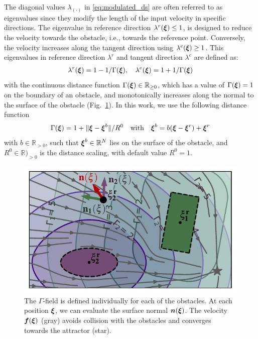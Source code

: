 The  diagonal values $\lambda_{(\cdot)}$  in \eqref{eq:modulated_ds} are often referred to as eigenvalues since they modify the length of the input velocity in specific directions. 
The eigenvalue in reference direction $\lambda^r(\boldsymbol{\xi}) \leq 1$, is designed to reduce the velocity towards the obstacle, i.e., towards the reference point.  
Conversely, the velocity increases along the tangent direction using $\lambda^e(\boldsymbol{\xi}) \geq 1$. This eigenvalues in reference direction $\lambda^r$ and tangent direction $\lambda^e$ are defined as:
\begin{equation}
\begin{split}
    \lambda^r(\vecs \xi) = 1 - 1 /\Gamma(\vecs \xi) , \quad \lambda^e(\vecs \xi) = 1 + 1 / \Gamma(\vecs \xi)
    \label{eq:eigenvalues}
    \end{split}
\end{equation}
with the continuous distance function $\Gamma(\boldsymbol{\xi}) \in \mathbb{R}_{\geq 0}$, which has a value of $\Gamma(\boldsymbol{\xi}) = 1$ on the boundary of an obstacle, and monotonically increases along the normal to the surface of the obstacle (Fig.~\ref{fig:resultant_normal}). In this work, we use the following distance function
\begin{equation}
  \Gamma(\vecs \xi) = 1 + \| \vecs \xi - \vecs \xi^b \|  / R^0
  \quad \text{with} \quad
  \vecs \xi^b = b (\vecs \xi - \vecs \xi^r) + \vecs \xi^r
  \label{eq:distance_function}
\end{equation}
with $b \in \mathbb{R}_{>0}$, such that $\boldsymbol{\xi}^b \in \mathbb{R}^N$ lies on the surface of the obstacle, and $R^0 \in \mathbb{R})_{>0}$ is the distance scaling, with default value $R^0 = 1$.

\begin{figure}
\centerline{\includegraphics[width=1.0\columnwidth]{figures/normal_and_gamma_field_visualization_annotated.pdf}}
\caption{
The $\Gamma$-field is defined individually for each of the obstacles. At each position $\boldsymbol{\xi}$, we can evaluate the surface normal $\boldsymbol{n}(\boldsymbol{\xi})$. 
The velocity $\boldsymbol{f}(\boldsymbol{\xi})$ (gray) avoids collision with the obstacles and converges towards the attractor (star).}
\label{fig:resultant_normal}
\end{figure}

